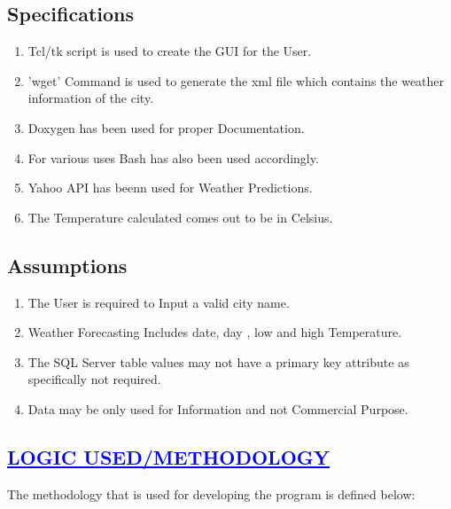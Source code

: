 \documentclass[a4paper,12pt]{report}
\begin{document}
\section*{Specifications}

\begin{enumerate}
\item Tcl/tk script is used to create the GUI for the User.
\item 'wget' Command is used to generate the xml file which contains the weather information of the city.
\item Doxygen has been used for proper Documentation.
\item For various uses Bash has also been used accordingly.
\item Yahoo API has beenn used for Weather Predictions.
\item The Temperature calculated comes out to be in Celsius.

\end{enumerate}

\section*{Assumptions}

\begin{enumerate}
\item The User is required to Input a valid city name.
\item Weather Forecasting Includes date, day , low and high Temperature.
\item The SQL Server table values may not have a primary key attribute as specifically not required.
\item Data may be only used for Information and not Commercial Purpose.
\end{enumerate}
 
\begin{center}
\chapter{\textcolor{blue}{\underline {LOGIC USED/METHODOLOGY}}}
\end{center}
The methodology that is used for developing the program is defined below:\\
\end{document}
